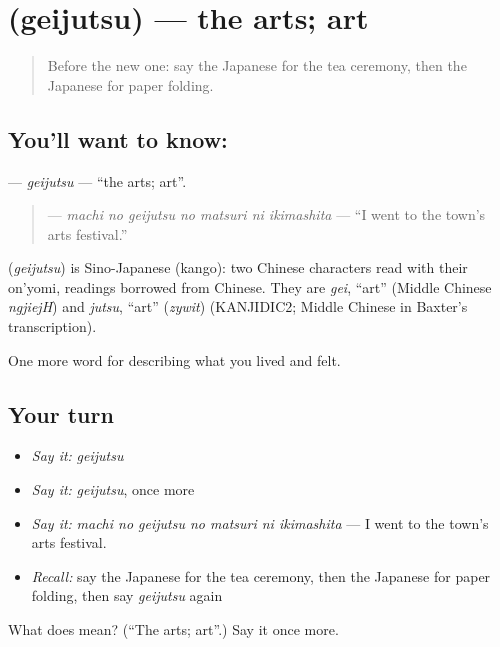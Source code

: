 \section[\texorpdfstring{\ja{げいじゅつ} (geijutsu)}{げいじゅつ (geijutsu)}]{ (geijutsu) — the arts; art}

\label{lesson:JA-C466-geijutsu}



\begin{quote}
Before the new one: say the Japanese for the tea ceremony, then the Japanese for paper folding.
\end{quote}

\subsection*{You'll want to know: }
\textbf{} — \emph{geijutsu} — \textquotedblleft{}the arts; art\textquotedblright{}.

\begin{quote}
\textbf{   } — \emph{machi no geijutsu no matsuri ni ikimashita} — \textquotedblleft{}I went to the town's arts festival.\textquotedblright{}
\end{quote}

\begin{cousinweb}
\textbf{} (\emph{geijutsu}) is Sino-Japanese (kango): two Chinese characters read with their on'yomi, readings borrowed from Chinese. They are \emph{gei}, \textquotedblleft{}art\textquotedblright{} (Middle Chinese \emph{ngjiejH}) and \emph{jutsu}, \textquotedblleft{}art\textquotedblright{} (\emph{zywit}) (KANJIDIC2; Middle Chinese in Baxter's transcription).
\end{cousinweb}

\begin{grammarlens}[title={What you've built}]
One more word for describing what you lived and felt.
\end{grammarlens}

\subsection*{Your turn}
\begin{itemize}
\raggedright
  \item \emph{Say it:} \emph{geijutsu}
  \item \emph{Say it:} \emph{geijutsu}, once more
  \item \emph{Say it:} \emph{machi no geijutsu no matsuri ni ikimashita} — I went to the town's arts festival.
  \item \emph{Recall:} say the Japanese for the tea ceremony, then the Japanese for paper folding, then say \emph{geijutsu} again
\end{itemize}

\begin{tcolorbox}[breakable,colback=teal!4,colframe=teal!35!black,title={Before you move on}]
What does  mean? (\textquotedblleft{}The arts; art\textquotedblright{}.) Say it once more.
\end{tcolorbox}
